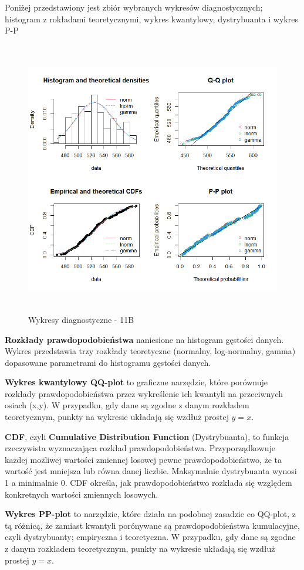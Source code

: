 \documentclass[a4paper,11pt]{article}
\begin{document}
Poniżej przedstawiony jest zbiór wybranych wykresów diagnostycznych; histogram z rokładami teoretycznymi, wykres kwantylowy, dystrybuanta i wykres P-P
\begin{figure}[h]
\centering
\includegraphics[width=12cm, height=12cm]{img/Wykresy_diagnostyczne_11B.png}
\caption{Wykresy diagnostyczne - 11B}
\end{figure}

\textbf{Rozkłady prawdopodobieństwa} naniesione na histogram gęstości danych. Wykres przedstawia trzy rozkłady teoretyczne (normalny, log-normalny, gamma) dopasowane parametrami do histogramu gęstości danych. 

\textbf{Wykres kwantylowy QQ-plot} to graficzne narzędzie, które porównuje rozkłady prawdopodobieństwa przez wykreślenie ich kwantyli na przeciwnych osiach (x,y). W przypadku, gdy dane są zgodne z danym rozkładem teoretycznym, punkty na wykresie układają się wzdłuż prostej \(y = x\).

\textbf{CDF}, czyli \textbf{Cumulative Distribution Function} (Dystrybuanta), to funkcja rzeczywista wyznaczająca rozkład prawdopodobieństwa. Przyporządkowuje każdej możliwej wartości zmiennej losowej pewne prawdopodobieństwo, że ta wartość jest mniejsza lub równa danej liczbie. Maksymalnie dystrybuanta wynosi 1 a minimalnie 0. CDF określa, jak prawdopodobieństwo rozkłada się względem konkretnych wartości zmiennych losowych.

\textbf{Wykres PP-plot} to narzędzie, które działa na podobnej zasadzie co QQ-plot, z tą różnicą, że zamiast kwantyli porónywane są prawdopodobieństwa kumulacyjne, czyli dystrybuanty; empiryczna i teoretyczna. W przypadku, gdy dane są zgodne z danym rozkładem teoretycznym, punkty na wykresie układają się wzdłuż prostej \(y = x\).
\end{document}
